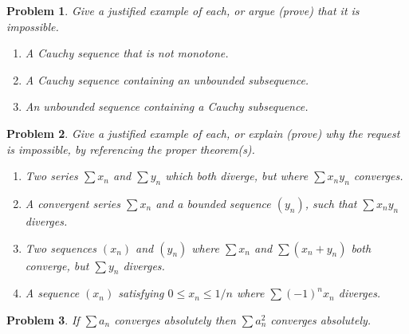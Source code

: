 \documentclass[12pt]{article}
\newtheorem{problem}{Problem}
\begin{document}
\begin{problem} %
Give a justified example of each, or argue (prove) that it is impossible.

\renewcommand{\labelenumi}{(\alph{enumi})}
\begin{enumerate}
\item A Cauchy sequence that is not monotone.


\item A Cauchy sequence containing an unbounded subsequence.


\item An unbounded sequence containing a Cauchy subsequence.


\end{enumerate}
\end{problem}


\begin{problem} %
Give a justified example of each, or explain (prove) why the request is impossible, by referencing the proper theorem(s).

\renewcommand{\labelenumi}{(\alph{enumi})}
\begin{enumerate}
\item Two series $\sum x_n$ and $\sum y_n$ which both diverge, but where $\sum x_n y_n$ converges.


\item A convergent series $\sum x_n$ and a bounded sequence $(y_n)$, such that $\sum x_n y_n$ diverges.


\item Two sequences $(x_n)$ and $(y_n)$ where $\sum x_n$ and $\sum (x_n+y_n)$ both converge, but $\sum y_n$ diverges.


\item A sequence $(x_n)$ satisfying $0\le x_n \le 1/n$ where $\sum (-1)^n x_n$ diverges.


\end{enumerate}
\end{problem}


\begin{problem} %
If $\sum a_n$ converges absolutely then $\sum a_n^2$ converges absolutely.
\end{problem}
\end{document}
